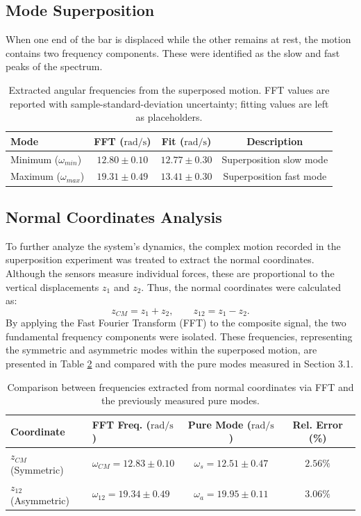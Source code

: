 \documentclass[a4paper,11pt]{article}
\begin{document}
\subsection{Mode Superposition}
When one end of the bar is displaced while the other remains at rest, the motion contains two frequency components. These were identified as the slow and fast peaks of the spectrum.

\begin{table}[H]
\centering
\begin{tabular}{lccc}
\toprule
\textbf{Mode} & \textbf{FFT ($\mathrm{rad/s}$)} & \textbf{Fit ($\mathrm{rad/s}$)} & \textbf{Description} \\
\midrule
Minimum ($\omega_{min}$) & $12.80 \pm 0.10$ & $12.77\pm0.30$ & Superposition slow mode \\
Maximum ($\omega_{max}$) & $19.31 \pm 0.49$ & $13.41\pm0.30$ & Superposition fast mode \\
\bottomrule
\end{tabular}
\caption{Extracted angular frequencies from the superposed motion. FFT values are reported with sample-standard-deviation uncertainty; fitting values are left as placeholders.}
\label{tab:superposition_frequencies}
\end{table}

\subsection{Normal Coordinates Analysis}
To further analyze the system's dynamics, the complex motion recorded in the superposition experiment was treated to extract the normal coordinates. Although the sensors measure individual forces, these are proportional to the vertical displacements $z_1$ and $z_2$. Thus, the normal coordinates were calculated as:
\begin{equation}
z_{CM} = z_1 + z_2, \qquad z_{12} = z_1 - z_2.
\end{equation}
By applying the Fast Fourier Transform (FFT) to the composite signal, the two fundamental frequency components were isolated. These frequencies, representing the symmetric and asymmetric modes within the superposed motion, are presented in Table \ref{tab:normal_coords} and compared with the pure modes measured in Section 3.1.

\begin{table}[H]
\centering
\begin{tabular}{llcc}
\toprule
\textbf{Coordinate} & \textbf{FFT Freq. ($\mathrm{rad/s}$)} & \textbf{Pure Mode ($\mathrm{rad/s}$)} & \textbf{Rel. Error (\%)} \\
\midrule
$z_{CM}$ (Symmetric) & $\omega_{CM} = 12.83 \pm 0.10$ & $\omega_s = 12.51 \pm 0.47$ & $2.56\%$ \\
$z_{12}$ (Asymmetric) & $\omega_{12} = 19.34 \pm 0.49$ & $\omega_a = 19.95 \pm 0.11$ & $3.06\%$ \\
\bottomrule
\end{tabular}
\caption{Comparison between frequencies extracted from normal coordinates via FFT and the previously measured pure modes.}
\label{tab:normal_coords}
\end{table}
\end{document}
